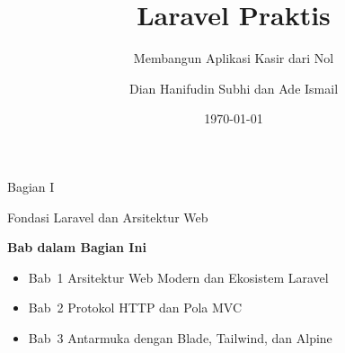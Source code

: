 \documentclass[
    paper=23cm:15.5cm,   %
    11pt,               %
    twoside,            %
    openany,            %
    bibliography=totoc, %
]{scrbook}            %
\title{Laravel Praktis}
\subtitle{Membangun Aplikasi Kasir dari Nol}
\author{Dian Hanifudin Subhi dan Ade Ismail}
\date{\today}
\begin{document}
\frontmatter









\renewcommand{\contentsname}{Daftar Isi}
\tableofcontents

\listoftables

\mainmatter

\vspace*{4cm}
{\fontsize{28}{34}\sffamily\bfseries\raggedright Bagian I\par}
\vspace{6pt}
{\fontsize{22}{28}\sffamily\bfseries\raggedright Fondasi Laravel dan Arsitektur Web\par}
\vspace{16pt}
{\large\sffamily\bfseries Bab dalam Bagian Ini}\par
\vspace{6pt}
\begin{itemize}[topsep=0pt, itemsep=2pt]
  \item Bab~1 \textbullet{} Arsitektur Web Modern dan Ekosistem Laravel
  \item Bab~2 \textbullet{} Protokol HTTP dan Pola MVC
  \item Bab~3 \textbullet{} Antarmuka dengan Blade, Tailwind, dan Alpine
\end{itemize}
\newpage






\end{document}
